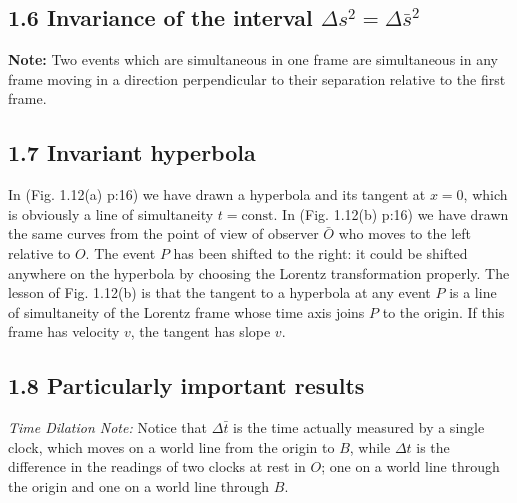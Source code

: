 \documentclass[12pt]{book}
\begin{document}
    \subsection{1.6 Invariance of the interval \(\Delta s^2 = \Delta \bar{ s}^2\) }
        \textbf{Note:} Two events which are simultaneous in one frame are simultaneous in any frame moving in a direction perpendicular to their separation relative to the first frame.
        
    \subsection{1.7 Invariant hyperbola}
        In (Fig. 1.12(a) p:16) we have drawn a hyperbola and its tangent at \( x = 0 \), which is obviously a line of simultaneity \( t = \text{const} \). In (Fig. 1.12(b) p:16) we have drawn the same curves from the point of view of observer \( \bar{O} \) who moves to the left relative to \( O \). The event \( P \) has been shifted to the right: it could be shifted anywhere on the hyperbola by choosing the Lorentz transformation properly. The lesson of Fig. 1.12(b) is that the tangent to a hyperbola at any event \( P \) is a line of simultaneity of the Lorentz frame whose time axis joins \( P \) to the origin. If this frame has velocity \( v \), the tangent has slope \( v \).
    \subsection{1.8 Particularly important results}
        \textit{Time Dilation Note:} Notice that \( \Delta \bar{t} \) is the time actually measured by a single clock, which moves on a world line from the origin to \( B \), while \( \Delta t \) is the difference in the readings of two clocks at rest in \( O \); one on a world line through the origin and one on a world line through \( B \).
        
\end{document}
